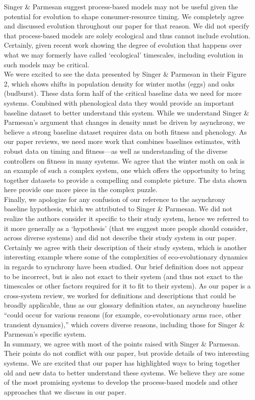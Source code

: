 \documentclass[11pt,letter]{article}
\begin{document}
Singer \& Parmesan suggest process-based models may not be useful given the potential for evolution to shape consumer-resource timing. We completely agree and discussed evolution throughout our paper for that reason. We did not specify that process-based models are solely ecological and thus cannot include evolution. Certainly, given recent work showing the degree of evolution that happens over what we may formerly have called `ecological' timescales, including evolution in such models may be critical. \\

We were excited to see the data presented by Singer \& Parmesan in their Figure 2, which shows shifts in population density for winter moths (eggs) and oaks (budburst). These data form half of the critical baseline data we need for more systems. Combined with phenological data they would provide an important baseline dataset to better understand this system. While we understand Singer \& Parmesan's argument that changes in density must be driven by asynchrony, we believe a strong baseline dataset requires data on both fitness and phenology. As our paper reviews, we need more work that combines baselines estimates, with robust data on timing and fitness---as well as understanding of the diverse controllers on fitness in many systems. We agree that the winter moth on oak is an example of such a complex system, one which offers the opportunity to bring together datasets to provide a compelling and complete picture. The data shown here provide one more piece in the complex puzzle. \\

Finally, we apologize for any confusion of our reference to the asynchrony baseline hypothesis, which we attributed to Singer \& Parmesan. We did not realize the authors consider it specific to their study system, hence we referred to it more generally as a `hypothesis' (that we suggest more people should consider, across diverse systems) and did not describe their study system in our paper. Certainly we agree with their description of their study system, which is another interesting example where some of the complexities of eco-evolutionary dynamics in regards to synchrony have been studied. Our brief definition does not appear to be incorrect, but is also not exact to their system (and thus not exact to the timescales or other factors required for it to fit to their system).  As our paper is a cross-system review, we worked for definitions and descriptions that could be broadly applicable, thus as our glossary definition states, an asynchrony baseline ``could occur for various reasons (for example, co-evolutionary arms race, other transient dynamics),'' which covers diverse reasons, including those for Singer \& Parmesan's specific system.\\

In summary, we agree with most of the points raised with Singer \& Parmesan. Their points do not conflict with our paper, but provide details of two interesting systems. We are excited that our paper has highlighted ways to bring together old and new data to better understand these systems. We believe they are some of the most promising systems to develop the process-based models and other approaches that we discuss in our paper. 
\end{document}
